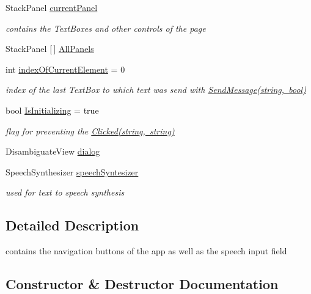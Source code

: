 \begin{DoxyCompactItemize}
Stack\+Panel \mbox{\hyperlink{class_listen_to_me_1_1_main_page_a6dbd09c74d99bf0223489a06035980eb}{current\+Panel}}
\begin{DoxyCompactList}\small\item\em contains the Text\+Boxes and other controls of the page \end{DoxyCompactList}\item 
Stack\+Panel \mbox{[}$\,$\mbox{]} \mbox{\hyperlink{class_listen_to_me_1_1_main_page_a6bb5a969c5955f0d7eca81e420fa0193}{All\+Panels}}
\item 
int \mbox{\hyperlink{class_listen_to_me_1_1_main_page_acc0f3cb24ff26c2cfc76cd42a2fe2118}{index\+Of\+Current\+Element}} = 0
\begin{DoxyCompactList}\small\item\em index of the last Text\+Box to which text was send with \mbox{\hyperlink{class_listen_to_me_1_1_main_page_a09c2518852d4261ff6a2118c8e01de9f}{Send\+Message(string, bool)}} \end{DoxyCompactList}\item 
bool \mbox{\hyperlink{class_listen_to_me_1_1_main_page_a448f51804566fe32efca61994caf9ab9}{Is\+Initializing}} = true
\begin{DoxyCompactList}\small\item\em flag for preventing the \mbox{\hyperlink{class_listen_to_me_1_1_main_page_a465e7f9723aec19e912a3913841d477e}{Clicked(string, string)}} \end{DoxyCompactList}\item 
Disambiguate\+View \mbox{\hyperlink{class_listen_to_me_1_1_main_page_af1acf9bff52880473e0889410ead00c4}{dialog}}
\item 
Speech\+Synthesizer \mbox{\hyperlink{class_listen_to_me_1_1_main_page_a5d61d66540a58eb612a80a05f2236548}{speech\+Syntesizer}}
\begin{DoxyCompactList}\small\item\em used for text to speech synthesis \end{DoxyCompactList}\end{DoxyCompactItemize}


\subsection{Detailed Description}
contains the navigation buttons of the app as well as the speech input field 



\subsection{Constructor \& Destructor Documentation}
\mbox{\label{class_listen_to_me_1_1_main_page_afb2ff548c6284f6f179fc9b3dcc89245}} 
